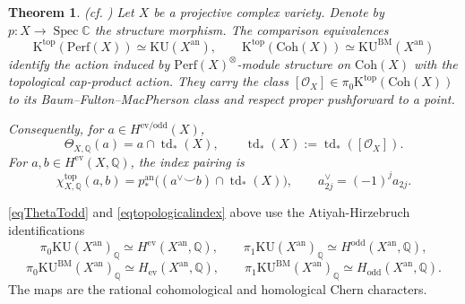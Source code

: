 \documentclass{amsart}
\theoremstyle{plain}
\newtheorem{theorem}[prop]{Theorem}
\theoremstyle{definition}
\newcommand{\bbC}{\mathbb{C}}
\newcommand{\bbQ}{\mathbb{Q}}
\newcommand{\Perf}{\mathrm{Perf}}
\newcommand{\K}{\mathrm{K}}
\newcommand{\KU}{\mathrm{KU}}
\newcommand{\Coh}{\mathrm{Coh}}
\DeclareMathOperator{\Spec}{Spec}
\DeclareMathOperator{\td}{td}
\newcommand{\an}{\mathrm{an}}
\begin{document}
\begin{theorem}\label{proptopcomparison}(cf. \cite[Lemma 4.2]{PT26})
\label{reqtopcomparison}
Let $X$ be a projective complex variety. Denote by $p:X\to\Spec\bbC$ the structure morphism. The comparison equivalences
\begin{equation}\label{Ktopcomparison}
\K^{\mathrm{top}}(\Perf(X))\simeq\KU(X^{\an}),
\qquad
\K^{\mathrm{top}}(\Coh(X))\simeq\KU^{\mathrm{BM}}(X^{\an})
\end{equation}
identify the action induced by $\Perf(X)^\otimes$-module structure on $\Coh(X)$ with the topological cap-product action. They carry the
class $[\mathcal O_X]\in\pi_0\K^\mathrm{top}(\Coh(X))$ to its Baum--Fulton--MacPherson class and respect proper pushforward to a point.

Consequently,
for $a\in H^{\mathrm{ev}/\mathrm{odd}}(X)$,
\begin{equation}\label{eqThetaTodd}
\Theta_{X,\bbQ}(a)=a\cap\td_*(X),
\qquad \td_*(X):=\td_*([\mathcal O_X]).
\end{equation}
For $a,b\in H^{\mathrm{ev}}(X,\bbQ)$, the index pairing is
\begin{equation}\label{eqtopologicalindex}
\chi^{\mathrm{top}}_{X,\bbQ}(a,b)
=p^\an_*\bigl((a^\vee\smile b)\cap\td_*(X)\bigr),
\qquad a^\vee_{2j}=(-1)^j a_{2j}.
\end{equation}
\end{theorem}

\eqref{eqThetaTodd} and \eqref{eqtopologicalindex} above use the Atiyah-Hirzebruch identifications
\[
\pi_0\KU(X^\an)_{\bbQ} \simeq H^{\mathrm{ev}}(X^{\an},\bbQ), \qquad
\pi_1\KU(X^\an)_{\bbQ}
\simeq H^{\mathrm{odd}}(X^{\an},\bbQ),
\]
\[
\pi_0\KU^\mathrm{BM}(X^\an)_{\bbQ}
\simeq H_{\mathrm{ev}}(X^{\an},\bbQ), \qquad
\pi_1\KU^{\mathrm{BM}}(X^\an)_{\bbQ}
\simeq H_{\mathrm{odd}}(X^{\an},\bbQ).
\]
The maps are the rational cohomological and homological Chern characters.
\end{document}
